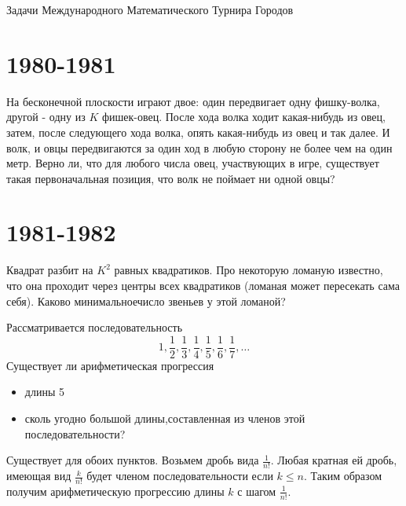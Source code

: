 \documentclass[11pt, a4paper]{template}
\begin{document}
\begin{titlepage}
  \begin{center}
	\Huge{Задачи Международного Математического Турнира Городов}
  \end{center}
\end{titlepage}


\chapter{1980-1981}

\begin{exercise}
На бесконечной плоскости играют двое: один передвигает одну фишку-волка, другой - одну из $K$ фишек-овец. После хода волка ходит какая-нибудь из овец, затем, после следующего хода волка, опять какая-нибудь из овец и так далее. И волк, и овцы передвигаются за один ход в любую сторону не более чем на один метр. Верно ли, что для любого числа овец, участвующих в игре, существует такая первоначальная позиция, что волк не поймает ни одной овцы?
\end{exercise}


\chapter{1981-1982}

\begin{exercise}
Квадрат разбит на $K^{2}$ равных квадратиков. Про некоторую ломаную известно, что она проходит через центры всех квадратиков (ломаная может пересекать сама себя). Каково минимальноечисло звеньев у этой ломаной?
\end{exercise}

\begin{exercise}
Рассматривается последовательность
$$
1, \frac{1}{2}, \frac{1}{3}, \frac{1}{4}, \frac{1}{5}, \frac{1}{6}, \frac{1}{7}, \dots
$$
Существует ли арифметическая прогрессия
\begin{itemize}
\item длины 5
\item сколь угодно большой длины,составленная из членов этой последовательности?
\end{itemize}
\end{exercise}
 
\begin{solution}
Существует для обоих пунктов. Возьмем дробь вида $\frac{1}{n!}$. Любая кратная ей дробь, имеющая вид
$\frac{k}{n!}$ будет членом последовательности если $k \leqslant n$. Таким образом получим арифметическую прогрессию длины $k$ с шагом $\frac{1}{n!}$.
\end{solution}
\end{document}
